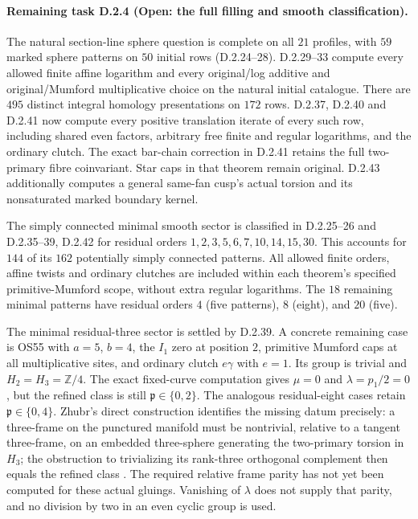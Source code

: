\paragraph{Remaining task D.2.4 (Open: the full filling and smooth classification).}
The natural section-line sphere question is complete on all $21$
profiles, with $59$ marked sphere patterns on $50$ initial rows
(D.2.24--28). D.2.29--33 compute every allowed finite affine
logarithm and every original/log additive and original/Mumford
multiplicative choice on the natural initial catalogue. There are
$495$ distinct integral homology presentations on $172$ rows.
D.2.37, D.2.40 and D.2.41 now compute every positive translation
iterate of every such row, including shared even factors, arbitrary
free finite and regular logarithms, and the ordinary clutch.
The exact bar-chain correction in D.2.41 retains the full
two-primary fibre coinvariant. Star caps in that theorem remain
original. D.2.43 additionally computes a general same-fan cusp's
actual torsion and its nonsaturated marked boundary kernel.

The simply connected minimal smooth sector is classified in
D.2.25--26 and D.2.35--39, D.2.42 for residual orders
$1,2,3,5,6,7,10,14,15,30$. This accounts for $144$ of its $162$
potentially simply connected patterns. All allowed finite orders,
affine twists and ordinary clutches are included within each
theorem's specified primitive-Mumford scope, without extra regular
logarithms. The $18$ remaining minimal patterns have residual
orders $4$ (five patterns), $8$ (eight), and $20$ (five).

The minimal residual-three sector is settled by D.2.39. A concrete
remaining case is OS55 with $a=5$, $b=4$, the $I_1$ zero at position
$2$, primitive Mumford caps at all multiplicative sites, and ordinary
clutch $e\gamma$ with $e=1$. Its group is trivial and
$H_2=H_3=\mathbb Z/4$. The exact fixed-curve computation gives
$\mu=0$ and $\lambda=p_1/2=0$, but the refined class is still
$\mathfrak p\in\{0,2\}$. The analogous residual-eight cases retain
$\mathfrak p\in\{0,4\}$. Zhubr's direct construction identifies the
missing datum precisely: a three-frame on the punctured manifold
must be nontrivial, relative to a tangent three-frame, on an embedded
three-sphere generating the two-primary torsion in $H_3$; the
obstruction to trivializing its rank-three orthogonal complement
then equals the refined class
\cite[Theorem 1 and Sections 3, 5, pp.6, 8--9]{ffZhubr13}.
The required relative frame parity has not yet been computed for
these actual gluings. Vanishing of $\lambda$ does not supply that
parity, and no division by two in an even cyclic group is used.



